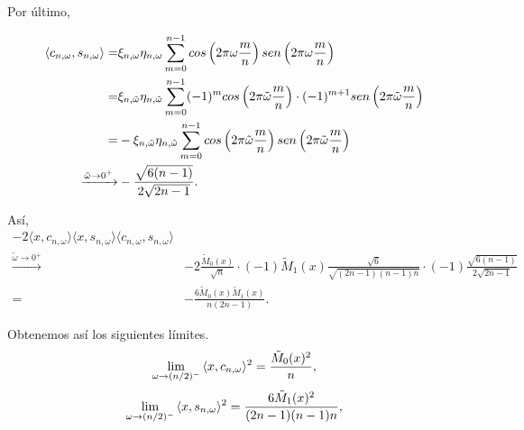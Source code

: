 Por último, 

\begin{align*}
\langle
c_{n, \omega}, s_{n, \omega}
\rangle = &
\xi_{n, \omega} \eta_{n, \omega}
\suma{m=0}{n-1}{
cos\left(
2 \pi \omega\frac{m}{n}
\right)
sen\left(
2 \pi \omega\frac{m}{n}
\right)
} \\
= &
\xi_{n, \tilde{\omega}} \eta_{n, \tilde{\omega}}
\suma{m=0}{n-1}{
(-1)^{m}cos\left(
2 \pi \tilde{\omega} \frac{m}{n}
\right) \cdot (-1)^{m+1}
sen\left(
2 \pi \tilde{\omega} \frac{m}{n}
\right)
}
\\
= &
-\xi_{n, \tilde{\omega}} \eta_{n, \tilde{\omega}}
\suma{m=0}{n-1}{
cos\left(
2 \pi \tilde{\omega}\frac{m}{n}
\right) 
sen\left(
2 \pi \tilde{\omega}\frac{m}{n}
\right)
}
\\
\xrightarrow{\tilde{\omega} \rightarrow 0^{+}}&
- \frac{\sqrt{6(n-1)}}{2 \sqrt{2n-1}}.
\end{align*}

Así,
\begin{align*}
-2 \langle x, c_{n, \omega} \rangle
\langle x, s_{n, \omega} \rangle
\langle c_{n, \omega}, s_{n, \omega} \rangle & \\
\xrightarrow{\tilde{\omega} \rightarrow 0^{+}} & 
-2 \frac{\tilde{M}_{0}(x)}{\sqrt{n}}
\cdot 
(-1) \tilde{M}_{1}(x)\frac{\sqrt{6}}{
\sqrt{(2n-1)(n-1)n}}
\cdot (-1)
\frac{\sqrt{6(n-1)}}{2 \sqrt{2n-1}}
\\
= & - \frac{6 \tilde{M}_{0}(x)\tilde{M}_{1}(x)}{n(2n-1)}.
\end{align*}



Obtenemos así los siguientes límites.
\begin{equation}
\label{ec: limite x, cnw cuadr n med}
\lim\limits_{\omega \rightarrow (n/2)^{-}}{\langle
x, c_{n, \omega}
\rangle^{2} }
= \frac{\tilde{M}_{0}(x)^{2}}{n},
\end{equation}
\begin{equation}
\label{ec: limite x, snw cuad n med}
\lim\limits_{\omega \rightarrow (n/2)^{-}}{\langle
x, s_{n, \omega}
\rangle^{2} }
= \frac{6\tilde{M}_{1}(x)^{2}}{(2n-1)(n-1)n},
\end{equation}

